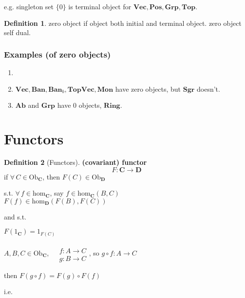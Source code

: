 \documentclass[twoside,landscape,10pt]{amsart}
\theoremstyle{plain}
\theoremstyle{definition}
\newtheorem{definition}{Definition}
\theoremstyle{remark}
\begin{document}
\begin{multicols*}{2}
e.g. singleton set $\lbrace 0 \rbrace$ is terminal object for $\mathbf{\text{Vec}}, \mathbf{\text{Pos}}, \mathbf{\text{Grp}}, \mathbf{\text{Top}}$.  

\begin{definition}
  zero object if object both initial and terminal object.  zero object self dual.  
\end{definition}

\subsubsection{Examples (of zero objects)}
\begin{enumerate}
\item 
\item $\mathbf{\text{Vec}}, \mathbf{\text{Ban}}, \mathbf{\text{Ban}}_b, \mathbf{\text{TopVec}}, \mathbf{\text{Mon}}$ have zero objects, but $\mathbf{\text{Sgr}}$ doesn't.  
\item $\mathbf{\text{Ab}}$ and $\mathbf{\text{Grp}}$ have $0$ objects, $\mathbf{\text{Ring}}$.  
\end{enumerate}



\section{Functors}

\begin{definition}[Functors]
\textbf{(covariant) functor} 
\[
F : \mathbf{C} \to \mathbf{D}
\]
if $\forall \, C \in \text{Ob}_{\mathbf{C}}$, then $F(C) \in \text{Ob}_{\mathbf{D}}$

s.t. $\forall \, f \in \text{hom}_{\mathbf{C}}$, say $f\in \text{hom}_{\mathbf{C}}(B,C)$ \\
\phantom{s.t. } $F(f) \in \text{hom}_{\mathbf{D}}(F(B),F(C))$

and s.t. 

$F(1_{\mathbf{C}}) = 1_{F(C)}$

$A,B,C \in \text{Ob}_{\mathbf{C}}$, $\begin{aligned} & \quad \\
  & f:A \to C \\
  & g:B\to C \end{aligned}$, so $g\circ f : A \to C$

then $F(g\circ f) = F(g) \circ F(f)$
\end{definition}
i.e.




\end{multicols*}
\end{document}
